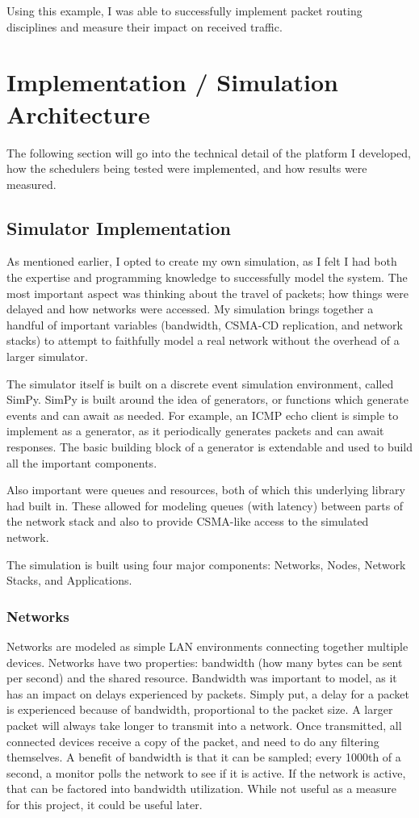 \documentclass[conference]{IEEEtran}
\begin{document}
Using this example, I was able to successfully implement packet routing disciplines and measure their impact on received traffic.

    \section{Implementation / Simulation Architecture} \label{sec:impl}
The following section will go into the technical detail of the platform I developed, how the schedulers being tested were
implemented, and how results were measured.

    \subsection{Simulator Implementation}
As mentioned earlier, I opted to create my own simulation, as I felt I had both the expertise and programming knowledge
to successfully model the system.
The most important aspect was thinking about the travel of packets; how things were delayed
and how networks were accessed.
My simulation brings together a handful of important variables (bandwidth, CSMA-CD replication, and network stacks) to
attempt to faithfully model a real network without the overhead of a larger simulator.

The simulator itself is built on a discrete event simulation environment, called SimPy.
SimPy is built around the idea of generators, or functions which generate events and can await as needed.
For example, an ICMP echo client is simple to implement as a generator, as it periodically generates packets and can
await responses.
The basic building block of a generator is extendable and used to build all the important components.

Also important were queues and resources, both of which this underlying library had built in.
These allowed for modeling queues (with latency) between parts of the network stack and also to provide CSMA-like access
to the simulated network.

The simulation is built using four major components: Networks, Nodes, Network Stacks, and Applications.

    \subsubsection{Networks}
Networks are modeled as simple LAN environments connecting together multiple devices.
Networks have two properties: bandwidth (how many bytes can be sent per second) and the shared resource.
Bandwidth was important to model, as it has an impact on delays experienced by packets.
Simply put, a delay for a packet is experienced because of bandwidth, proportional to the packet size.
A larger packet will always take longer to transmit into a network.
Once transmitted, all connected devices receive a copy of the packet, and need to do any filtering themselves.
A benefit of bandwidth is that it can be sampled; every 1000th of a second, a monitor polls the network to see if it is
active.
If the network is active, that can be factored into bandwidth utilization.
While not useful as a measure for this project, it could be useful later.
\end{document}
